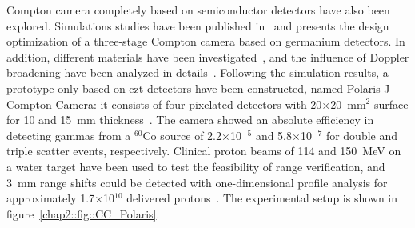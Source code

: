 Compton camera completely based on semiconductor detectors have also been explored. Simulations studies have been published in~\parencite{Peterson2010} and presents the design optimization of a three-stage Compton camera based on germanium detectors. In addition, different materials have been investigated~\parencite{Robertson2011}, and the influence of Doppler broadening have been analyzed in details~\parencite{Mackin2013}. 
Following the simulation results, a prototype only based on \gls{czt} detectors have been constructed, named Polaris-J Compton Camera: it consists of four pixelated detectors with 20$\times$20~mm$^2$ surface for 10 and 15~mm thickness~\parencite{McCleskey2015}. The camera showed an absolute efficiency in detecting gammas from a $^{60}$Co source of 2.2$\times$10$^{-5}$ and 5.8$\times$10$^{-7}$ for double and triple scatter events, respectively. Clinical proton beams of 114 and 150~MeV on a water target have been used to test the feasibility of range verification, and 3~mm range shifts could be detected with one-dimensional profile analysis for approximately 1.7$\times$10$^{10}$ delivered protons~\parencite{Polf2015}. The experimental setup is shown in figure~\ref{chap2::fig::CC_Polaris}.

